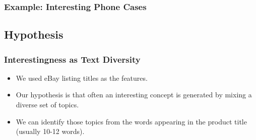 \documentclass{beamer}
\begin{document}
\begin{frame}
\frametitle{Example: Interesting Phone Cases}
\begin{figure}
\centering
{}
\label{fig:interesting}
\end{figure}
\end{frame}

\subsection{Hypothesis}

\begin{frame}
\frametitle{Interestingness as Text Diversity}
\begin{itemize}
\item We used eBay listing titles as the features.
\item Our hypothesis is that often an interesting concept is generated
  by mixing a diverse set of topics.
\item We can identify those topics from the words appearing in the
  product title (usually 10-12 words).
\end{itemize}
\end{frame}
\end{document}
